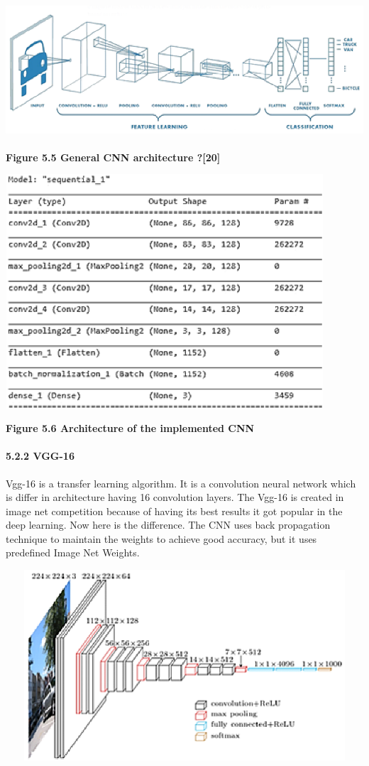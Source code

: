 \documentclass{article} %
\begin{document}
\noindent \includegraphics*[width=5.81in, height=1.98in, keepaspectratio=false, trim=0.15in 0.17in 0.08in 0.12in]{image24}

\noindent \textbf{Figure 5.5 General CNN architecture ?[20]}

\noindent \includegraphics*[width=4.67in, height=3.43in, keepaspectratio=false]{image25}

\noindent \textbf{Figure 5.6 Architecture of the implemented CNN}

\noindent 
\paragraph{5.2.2 VGG-16}

\noindent Vgg-16 is a transfer learning algorithm. It is a convolution neural network which is differ in architecture having 16 convolution layers. The Vgg-16 is created in image net competition because of having its best results it got popular in the deep learning. Now here is the difference. The CNN uses back propagation technique to maintain the weights to achieve good accuracy, but it uses predefined Image Net Weights.

\noindent \includegraphics*[width=6.01in, height=2.79in, keepaspectratio=false]{image26}
\end{document}
